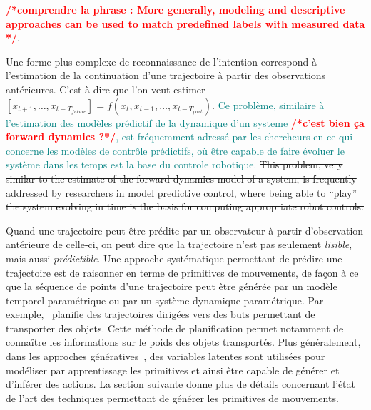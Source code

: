 \documentclass[utf8]{frontiersSCNS} %
\newcommand{\toimprove}[1]{\textcolor{teal}{#1}}
\newcommand{\todo}[1]{\textcolor{red}{\textbf{/*#1*/}}}
\begin{document}
\todo{comprendre la phrase : More generally, modeling and descriptive approaches can be used to match predefined labels with measured data \citep{csibra2007obsessed}}.

Une forme plus complexe de reconnaissance de l'intention correspond à l'estimation de la continuation d'une trajectoire à partir des observations antérieures. C'est à dire que l'on veut estimer $[x_{t+1}, \ldots, x_{t+T_{future}}] = f(x_t,x_{t-1},\ldots, x_{t-T_{past}})$. 
\toimprove{Ce problème, similaire à l'estimation des modèles prédictif de la dynamique d'un systeme \todo{c'est bien ça forward dynamics ?}, est fréquemment adressé par les chercheurs en ce qui concerne les modèles de contrôle prédictifs, où être capable de faire évoluer le système dans les temps est la base du controle robotique. }
\sout{This problem, very similar to the estimate of the forward dynamics model of a system, is frequently addressed by researchers in model predictive control, where being able to ``play'' the system evolving in time is the basis for computing appropriate robot controls. }

Quand une trajectoire peut être prédite par un observateur à partir d'observation antérieure de celle-ci, on peut dire que la trajectoire n'est pas seulement \textit{lisible}, mais aussi \textit{prédictible}.
Une approche systématique permettant de prédire une trajectoire est de raisonner en terme de primitives de mouvements, de façon à ce que la séquence de points d'une trajectoire peut être générée par un modèle temporel paramétrique ou par un système dynamique paramétrique.
Par exemple,~\cite{palinko2014communicative} planifie des trajectoires dirigées vers des buts permettant de transporter des objets. Cette méthode de planification permet notamment de connaître les informations sur le poids  des objets transportés.
Plus généralement, dans les approches génératives~\citep{buxton2003learning}, des variables latentes sont utilisées pour modéliser par apprentissage les primitives et ainsi être capable de générer et d'inférer des actions. La section suivante donne plus de détails concernant l'état de l'art des techniques permettant de générer les primitives de mouvements.
\end{document}
